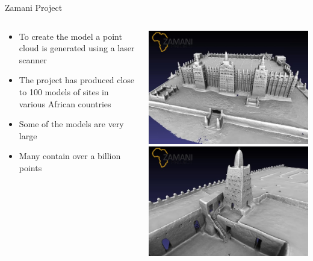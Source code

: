 \documentclass{beamer}
\begin{document}
\begin{frame}{Zamani Project}
\begin{columns}
\begin{column}{.65\linewidth}
\begin{itemize}
	\item To create the model a point cloud is generated using a laser scanner
    \item The project has produced close to 100 models of sites in various African countries
    \item Some of the models are very large
    \item Many contain over a billion points
\end{itemize}
\end{column}
\begin{column}{.35\linewidth}
\includegraphics[width=\linewidth]{images/zamani3.jpg} \\
\includegraphics[width=\linewidth]{images/zamani4.jpg}
\end{column}
\end{columns}

\end{frame}
\end{document}
